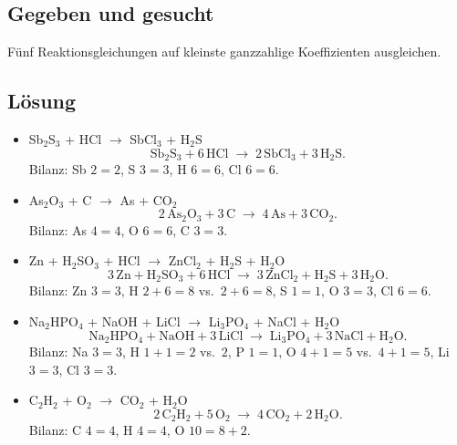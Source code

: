 
\subsection*{Gegeben und gesucht}
Fünf Reaktionsgleichungen auf kleinste ganzzahlige Koeffizienten ausgleichen.

\subsection*{Lösung}
\begin{itemize}
  \item[a)] Sb$_2$S$_3$ + HCl $\to$ SbCl$_3$ + H$_2$S
        \begin{equation}
          \mathrm{Sb_2S_3} + 6\,\mathrm{HCl} \;\to\;
          2\,\mathrm{SbCl_3} + 3\,\mathrm{H_2S}.
        \end{equation}
        Bilanz: Sb $2=2$, S $3=3$, H $6=6$, Cl $6=6$.
  \item[b)] As$_2$O$_3$ + C $\to$ As + CO$_2$
        \begin{equation}
          2\,\mathrm{As_2O_3} + 3\,\mathrm{C} \;\to\;
          4\,\mathrm{As} + 3\,\mathrm{CO_2}.
        \end{equation}
        Bilanz: As $4=4$, O $6=6$, C $3=3$.
  \item[c)] Zn + H$_2$SO$_3$ + HCl $\to$ ZnCl$_2$ + H$_2$S + H$_2$O
        \begin{equation}
          3\,\mathrm{Zn} + \mathrm{H_2SO_3} + 6\,\mathrm{HCl}
          \;\to\; 3\,\mathrm{ZnCl_2} + \mathrm{H_2S} + 3\,\mathrm{H_2O}.
        \end{equation}
        Bilanz: Zn $3=3$, H $2+6=8$ vs.\ $2+6=8$, S $1=1$, O $3=3$,
        Cl $6=6$.
  \item[d)] Na$_2$HPO$_4$ + NaOH + LiCl $\to$ Li$_3$PO$_4$ + NaCl + H$_2$O
        \begin{equation}
          \mathrm{Na_2HPO_4} + \mathrm{NaOH} + 3\,\mathrm{LiCl}
          \;\to\; \mathrm{Li_3PO_4} + 3\,\mathrm{NaCl} + \mathrm{H_2O}.
        \end{equation}
        Bilanz: Na $3=3$, H $1+1=2$ vs.\ $2$, P $1=1$, O $4+1=5$ vs.\
        $4+1=5$, Li $3=3$, Cl $3=3$.
  \item[e)] C$_2$H$_2$ + O$_2$ $\to$ CO$_2$ + H$_2$O
        \begin{equation}
          2\,\mathrm{C_2H_2} + 5\,\mathrm{O_2} \;\to\;
          4\,\mathrm{CO_2} + 2\,\mathrm{H_2O}.
        \end{equation}
        Bilanz: C $4=4$, H $4=4$, O $10 = 8+2$.
\end{itemize}

